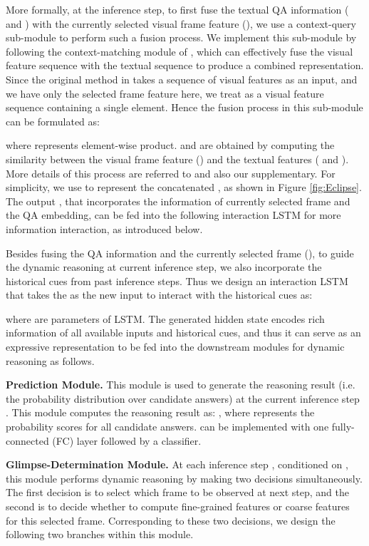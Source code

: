\documentclass[final]{cvpr}
\begin{document}
More formally, at the  inference step, to first fuse the textual QA information ( and ) with the currently selected visual frame feature (),
we use a context-query sub-module to perform such a fusion process. We implement this sub-module by following the context-matching module of \cite{lei2018tvqa}, which can effectively fuse the visual feature sequence with the textual sequence to produce a combined representation. Since the original method in \cite{lei2018tvqa} takes a sequence of visual features as an input, and we have only the selected frame feature  here, we treat  as a visual feature sequence containing a single element. Hence the fusion process in this sub-module can be formulated as:

where  represents element-wise product.  and  are obtained by computing the similarity between the visual frame feature () and the textual features ( and ). More details of this process are referred to \cite{lei2018tvqa} and also our supplementary.
For simplicity, we use  to represent the concatenated , as shown in Figure \ref{fig:Eclipse}. The 
output , that incorporates the information of currently selected frame and the QA embedding, can be fed into the following interaction LSTM for more information interaction, as introduced below.

Besides fusing the QA information and the currently selected frame (), to guide the dynamic reasoning at current inference step, we also incorporate the historical cues from 
past inference steps. Thus we design an interaction LSTM that takes the  as the new input to interact with the historical cues  as:

where  are parameters of LSTM. The generated hidden state  encodes rich information of all available inputs and historical cues, and thus it can serve as an expressive representation to be fed into the downstream modules for dynamic reasoning as follows.

{\bf Prediction Module.} This module is used to generate the reasoning result (i.e. the probability distribution over candidate answers) at the current inference step . This module computes the reasoning result as: , where  represents the probability scores for all candidate answers.  can be implemented with one fully-connected (FC) layer followed by a  classifier.


{\bf Glimpse-Determination Module.} At each inference step , conditioned on , this module performs dynamic reasoning by making two decisions simultaneously. The first decision is to select which frame to be observed at next step, and the second is to decide whether to compute fine-grained features or coarse features for this selected frame. 
Corresponding to these two decisions, we design the following two branches within this module.
\end{document}
